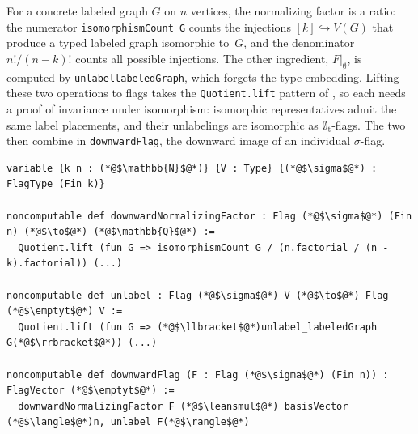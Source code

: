 \documentclass[acmsmall,screen=true,acmthm=false]{acmart}
\DeclareRobustCommand{\lean}[1]{{\def\_{\textunderscore\allowbreak}\texttt{#1}}}
\newcommand{\emptyt}{\emptyset_{\mathrm{t}}}
\newcommand{\leansmul}{\mathbin{\vcenter{\hbox{$\scriptstyle\bullet$}}}}
\begin{document}
For a concrete labeled graph $G$ on $n$ vertices, the normalizing factor is a
ratio: the numerator \lean{isomorphismCount G} counts the injections
$[k]\hookrightarrow V(G)$ that produce a typed labeled graph isomorphic
to~$G$, and the denominator $n!/(n-k)!$ counts all possible injections.  The
other ingredient, $F|_\emptyset$, is computed by
\lean{unlabel\_labeledGraph}, which forgets the type embedding.  Lifting these
two operations to flags takes the \lean{Quotient.lift} pattern of
, so each needs a proof of invariance under
isomorphism: isomorphic representatives admit the same label
placements, and their unlabelings are isomorphic as $\emptyt$-flags.  The two
then combine in \lean{downwardFlag}, the downward image of an individual
$\sigma$-flag.
\begin{lstlisting}
variable {k n : (*@$\mathbb{N}$@*)} {V : Type} {(*@$\sigma$@*) : FlagType (Fin k)}

noncomputable def downwardNormalizingFactor : Flag (*@$\sigma$@*) (Fin n) (*@$\to$@*) (*@$\mathbb{Q}$@*) :=
  Quotient.lift (fun G => isomorphismCount G / (n.factorial / (n - k).factorial)) (...)

noncomputable def unlabel : Flag (*@$\sigma$@*) V (*@$\to$@*) Flag (*@$\emptyt$@*) V :=
  Quotient.lift (fun G => (*@$\llbracket$@*)unlabel_labeledGraph G(*@$\rrbracket$@*)) (...)

noncomputable def downwardFlag (F : Flag (*@$\sigma$@*) (Fin n)) : FlagVector (*@$\emptyt$@*) :=
  downwardNormalizingFactor F (*@$\leansmul$@*) basisVector (*@$\langle$@*)n, unlabel F(*@$\rangle$@*)
\end{lstlisting}
\end{document}
